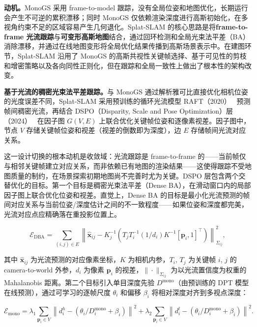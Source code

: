 \textbf{动机。}MonoGS 采用 frame-to-model 跟踪，没有全局位姿和地图优化，长期运行会产生不可逆的累积漂移；同时 MonoGS 仅依赖渲染深度进行高斯初始化，在多视角约束不足的区域容易产生几何退化。Splat-SLAM 的核心思路是将\textbf{frame-to-frame 光流跟踪}与\textbf{可变形高斯地图}结合，通过回环检测和全局光束法平差（BA）消除漂移，并通过在线地图变形将全局优化结果传播到高斯场景表示中。在建图环节，Splat-SLAM 沿用了 MonoGS 的高斯共视性关键帧选择、基于可见性的剪枝和增密策略以及各向同性正则化，但在跟踪和全局一致性上做出了根本性的架构改变。

\textbf{基于光流的稠密光束法平差跟踪。}与 MonoGS 通过解析雅可比直接优化相机位姿的光度误差不同，Splat-SLAM 采用预训练的循环光流模型 RAFT（2020）~\cite{teed2020raft} 预测帧间稠密光流，再结合 DSPO（Disparity, Scale and Pose Optimization）层（2024）~\cite{zhang2024glorie} 在因子图 $G(V, E)$ 上联合优化关键帧位姿和逐像素视差。因子图中，节点 $V$ 存储关键帧位姿和视差（视差的倒数即为深度），边 $E$ 存储帧间光流对应关系。

这一设计切换的根本动机是收敛域：光流跟踪是 frame-to-frame 的——当前帧仅与相邻关键帧建立对应关系，而非依赖已有地图的渲染结果——这使得跟踪不受地图质量的制约，在场景探索初期地图尚不完善时尤为关键。DSPO 层包含两个交替优化的目标。第一个目标是稠密光束法平差（Dense BA），在滑动窗口内的局部因子图上联合优化位姿和视差。直觉上，Dense BA 的目标是最小化光流预测的帧间对应关系与当前位姿/深度估计之间的不一致程度——如果位姿和深度都完美，光流对应点应精确落在重投影位置上。

\begin{equation*}
\mathcal{E}_{\mathrm{DBA}} = \sum_{(i,j) \in E} \left\| \hat{\mathbf{x}}_{ij} - K_j^{-1}\left(T_j T_i^{-1}(1/d_i) K^{-1}[\mathbf{p}_i, 1]^\top\right) \right\|^2_{\Sigma_{ij}},
\end{equation*}

其中 $\hat{\mathbf{x}}_{ij}$ 为光流预测的对应像素坐标，$K$ 为相机内参，$T_i$, $T_j$ 为关键帧 $i$, $j$ 的 camera-to-world 外参，$d_i$ 为像素 $\mathbf{p}_i$ 的视差，$\|\cdot\|_{\Sigma_{ij}}$ 为以光流置信度为权重的 Mahalanobis 距离。第二个目标引入单目深度先验 $D^{\mathrm{mono}}$（由预训练的 DPT 模型在线预测），通过可学习的逐帧尺度 $\theta_i$ 和偏移 $\beta_i$ 将相对深度对齐到多视点深度：

\begin{equation*}
\mathcal{E}_{\mathrm{mono}} = \lambda_1 \sum_{\mathbf{p}_i \in V} \left\| d_i^h - (\theta_i / D^{\mathrm{mono}}_i + \beta_i) \right\|^2 + \lambda_2 \sum_{\mathbf{p}_i \in V} \left\| d_i^l - (\theta_i / D^{\mathrm{mono}}_i + \beta_i) \right\|^2.
\end{equation*}

